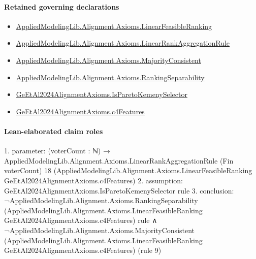 \documentclass[10pt]{article}
\begin{document}
\paragraph{Retained governing declarations}
\begin{itemize}\raggedright
\item \hyperlink{library-prerequisite-3c30aae25bef2671}{Applied\allowbreak{}Modeling\allowbreak{}Lib.\allowbreak{}Alignment.\allowbreak{}Axioms.\allowbreak{}Linear\allowbreak{}Feasible\allowbreak{}Ranking}
\item \hyperlink{library-prerequisite-43447e121a1884f9}{Applied\allowbreak{}Modeling\allowbreak{}Lib.\allowbreak{}Alignment.\allowbreak{}Axioms.\allowbreak{}Linear\allowbreak{}Rank\allowbreak{}Aggregation\allowbreak{}Rule}
\item \hyperlink{library-prerequisite-5d6a6008c423d214}{Applied\allowbreak{}Modeling\allowbreak{}Lib.\allowbreak{}Alignment.\allowbreak{}Axioms.\allowbreak{}Majority\allowbreak{}Consistent}
\item \hyperlink{library-prerequisite-ad3d3904c31ec7b5}{Applied\allowbreak{}Modeling\allowbreak{}Lib.\allowbreak{}Alignment.\allowbreak{}Axioms.\allowbreak{}Ranking\allowbreak{}Separability}
\item \hyperlink{paper-prerequisite-fa6ae496ed9c0c39}{Ge\allowbreak{}Et\allowbreak{}Al2024\allowbreak{}Alignment\allowbreak{}Axioms.\allowbreak{}Is\allowbreak{}Pareto\allowbreak{}Kemeny\allowbreak{}Selector}
\item \hyperlink{governing-declaration-2f0a2cc3cce8bb61}{Ge\allowbreak{}Et\allowbreak{}Al2024\allowbreak{}Alignment\allowbreak{}Axioms.\allowbreak{}c4\allowbreak{}Features}
\end{itemize}
\paragraph{Lean-elaborated claim roles}\begin{ReviewVerbatim}
1. parameter: (voterCount : ℕ) →
  AppliedModelingLib.Alignment.Axioms.LinearRankAggregationRule (Fin voterCount) 18
    (AppliedModelingLib.Alignment.Axioms.LinearFeasibleRanking GeEtAl2024AlignmentAxioms.c4Features)
2. assumption: GeEtAl2024AlignmentAxioms.IsParetoKemenySelector rule
3. conclusion: ¬AppliedModelingLib.Alignment.Axioms.RankingSeparability
      (AppliedModelingLib.Alignment.Axioms.LinearFeasibleRanking GeEtAl2024AlignmentAxioms.c4Features) rule ∧
  ¬AppliedModelingLib.Alignment.Axioms.MajorityConsistent
      (AppliedModelingLib.Alignment.Axioms.LinearFeasibleRanking GeEtAl2024AlignmentAxioms.c4Features) (rule 9)
\end{ReviewVerbatim}
\end{document}
